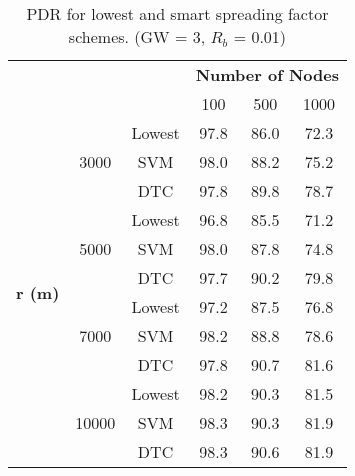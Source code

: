 \begin{table}[h]
\centering
\caption{PDR for lowest and smart spreading factor schemes. (GW = 3, ${R_{b}}$ = 0.01)}
\label{table:prediction_pdr}
\begin{tabular}{|c|c|c|c|c|c|}
\hline
\multicolumn{3}{|c|}{\multirow{2}{*}{}}                            & \multicolumn{3}{c|}{\textbf{Number of Nodes}} \\ \cline{4-6}
\multicolumn{3}{|c|}{}                                             & 100           & 500           & 1000          \\ \hline
\multirow{12}{*}{\textbf{r (m)}} & \multirow{3}{*}{3000}  & Lowest & 97.8          & 86.0          & 72.3          \\ \cline{3-6}
                                 &                        & SVM    & 98.0          & 88.2          & 75.2          \\ \cline{3-6}
                                 &                        & DTC    & 97.8          & 89.8          & 78.7          \\ \cline{2-6}

                                 & \multirow{3}{*}{5000}  & Lowest & 96.8          & 85.5          & 71.2          \\ \cline{3-6}
                                 &                        & SVM    & 98.0          & 87.8          & 74.8          \\ \cline{3-6}
                                 &                        & DTC    & 97.7          & 90.2          & 79.8          \\ \cline{2-6}

                                 & \multirow{3}{*}{7000}  & Lowest & 97.2          & 87.5          & 76.8          \\ \cline{3-6}
                                 &                        & SVM    & 98.2          & 88.8          & 78.6          \\ \cline{3-6}
                                 &                        & DTC    & 97.8          & 90.7          & 81.6          \\ \cline{2-6}

                                 & \multirow{3}{*}{10000} & Lowest & 98.2          & 90.3          & 81.5          \\ \cline{3-6}
                                 &                        & SVM    & 98.3          & 90.3          & 81.9          \\ \cline{3-6}
                                 &                        & DTC    & 98.3          & 90.6          & 81.9          \\ \hline
\end{tabular}
\end{table}

